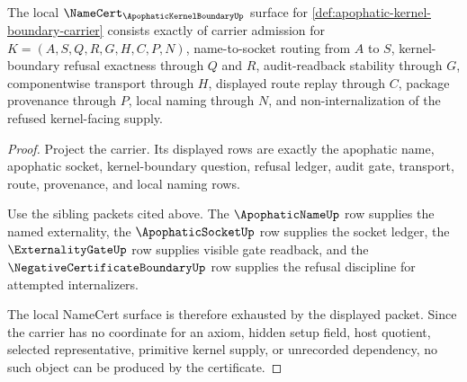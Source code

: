 \begin{theorem}
\label{thm:apophatic-kernel-boundary-namecert-obligations}
The local $\NameCert_{\ApophaticKernelBoundaryUp}$ surface for \autoref{def:apophatic-kernel-boundary-carrier} consists exactly of carrier admission for $K=(A,S,Q,R,G,H,C,P,N)$, name-to-socket routing from $A$ to $S$, kernel-boundary refusal exactness through $Q$ and $R$, audit-readback stability through $G$, componentwise transport through $H$, displayed route replay through $C$, package provenance through $P$, local naming through $N$, and non-internalization of the refused kernel-facing supply.
\end{theorem}
\begin{proof}
Project the carrier. Its displayed rows are exactly the apophatic name, apophatic socket, kernel-boundary question, refusal ledger, audit gate, transport, route, provenance, and local naming rows.

Use the sibling packets cited above. The $\ApophaticNameUp$ row supplies the named externality, the $\ApophaticSocketUp$ row supplies the socket ledger, the $\ExternalityGateUp$ row supplies visible gate readback, and the $\NegativeCertificateBoundaryUp$ row supplies the refusal discipline for attempted internalizers.

The local NameCert surface is therefore exhausted by the displayed packet. Since the carrier has no coordinate for an axiom, hidden setup field, host quotient, selected representative, primitive kernel supply, or unrecorded dependency, no such object can be produced by the certificate.
\end{proof}

